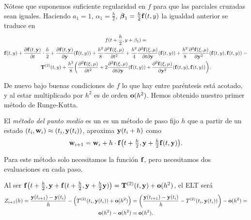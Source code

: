 Nótese que suponemos suficiente regularidad en $f$
para que las parciales cruzadas sean iguales.
Haciendo $a_1 = 1$, $\alpha_1 = \frac{h}{2}$, $\vb*{\beta}_1 = \frac{h}{2} \vb{f}(t,y)$
la igualdad anterior se traduce en
\begin{multline*}
    f(t + \frac{h}{2}, y + \beta_1) = \\
    \vb{f}(t,y) +
        \pdv{\vb{f}(t, \vb{y})}{t} \cdot \frac{h}{2} +
        \pdv{\vb{f}(t, \vb{y})}{\vb{y}} \qty(\vb{f}(t, y)) +
        \frac{h^2}{8}\pdv[2]{\vb{f}(\xi, \mu)}{t} +
        \frac{h^2}{4}\pdv{\vb{f}(\xi, \mu)}{t}{\vb{y}} \qty(\vb{f}(t, y)) +
        \frac{h^2}{8}\pdv[2]{\vb{f}(\xi, \mu)}{\vb{y}} \qty(\vb{f}(t, y), \vb{f}(t, y)) = \\
    \vb{T}^{(2)}(t, y) + \frac{h^2}{8}\qty(
        \pdv[2]{\vb{f}(\xi, \mu)}{t} +
        2\pdv{\vb{f}(\xi, \mu)}{t}{\vb{y}} \qty(\vb{f}(t, y)) +
        \pdv[2]{\vb{f}(\xi, \mu)}{\vb{y}} \qty(\vb{f}(t, y), \vb{f}(t, y))
    ).
\end{multline*}

De nuevo bajo buenas condiciones de $f$
lo que hay entre paréntesis está acotado,
y al estar multiplicado por $h^2$ es de orden $\vb{o}(h^2)$.
Hemos obtenido nuestro primer método de Runge-Kutta.

\begin{method}\label{met:euler}
    El \emph{método del punto medio} es un es un método de paso fijo $h$ que
    a partir de un estado $(t_i, \vb{w}_i) \approx (t_i, \vb{y}(t_i))$,
    aproxima $\vb{y}(t_i + h)$ como
    \begin{equation*}
        \vb{w}_{i+1} = \vb{w}_i + h\cdot \vb{f}\qty(
            t + \tfrac{h}{2}, \vb{y} + \tfrac{h}{2}\vb{f}(t, \vb{y})
        ).
    \end{equation*}
\end{method}

\begin{remark}
    Para este método solo necesitamos la función $\vb{f}$,
    pero necesitamos dos evaluaciones en cada paso.
\end{remark}

\begin{remark}
    Al ser $\vb{f}\qty(
        t + \tfrac{h}{2}, \vb{y} + \vb{f}(t + \tfrac{h}{2}, \vb{y} + \tfrac{h}{2}\vb{y})
    ) = \vb{T}^{(2)}(t, \vb{y}) + \vb{o}(h^2)$,
    el ELT será
    \begin{multline*}
        Z_{i+1}(h) =
        \frac{\vb{y}(t_{i+1}) - \vb{y}(t_i)}{h} - \qty(
            T^{(2)}(t_i, \vb{y}(t_i)) + \vb{o}(h^2)
        ) =
        \qty(
            \frac{\vb{y}(t_{i+1}) - \vb{y}(t_i)}{h} - T^{(2)}(t_i, \vb{y}(t_i))
        ) - \vb{o}(h^2) = \\
        \vb{o}(h^2) - \vb{o}(h^2) = \vb{o}(h^2).
    \end{multline*}
\end{remark}

